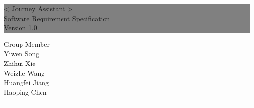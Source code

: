\documentclass[10pt]{article}
\begin{document}

\begin{titlepage} %
	
	
	\colorbox{grey}{
		\parbox[t]{1.1\textwidth}{ %
			\parbox[t]{1.02\textwidth}{ %
				\raggedleft %
				\fontsize{34pt}{40pt}\selectfont %
				\vspace{0.7cm} %
				
				< Journey Assistant >\\
                Software Requirement Specification\\
                Version 1.0\\
				
				\vspace{0.7cm} %
			}
		}
	}
	
	\vfill %
	
	
	\parbox[t]{1\textwidth}{ %
		\raggedleft %
		\large %
		{\Large Group Member}\\[4pt] %
        Yiwen Song\\
        Zhihui Xie\\
        Weizhe Wang\\
        Huangfei Jiang\\
        Haoping Chen\\
		
		\hfill\rule{0.2\linewidth}{1pt}%
    }
    
	
\end{titlepage}
\end{document}
